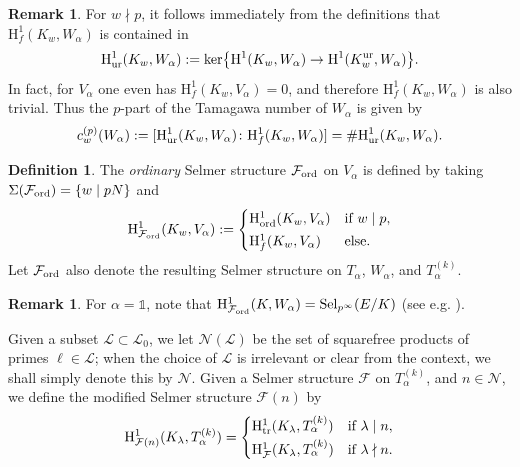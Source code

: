 \documentclass[10pt,reqno]{amsart}
\numberwithin{equation}{section}
\theoremstyle{plain}
\theoremstyle{definition}
\newtheorem{defi}[thm]{Definition}
\newtheorem{rmk}[thm]{Remark}
\theoremstyle{definition}
\theoremstyle{plain}
\theoremstyle{plain}
\theoremstyle{plain}
\theoremstyle{plain}
\theoremstyle{plain}
\theoremstyle{plain}
\DeclareMathOperator{\ord}{ord}
\newcommand{\Lcal}{\mathcal{L}}
\newcommand{\Fcal}{\mathcal{F}}
\newcommand{\rH}{\mathrm{H}}
\begin{document}
\begin{rmk}\label{rem:tam}
For $w\nmid p$, it follows immediately from the definitions that $\rH^1_f(K_w,W_\alpha)$ is contained in 
\[
\rH^1_{\rm ur}(K_w,W_{\alpha}):={\rm ker}\bigl\{\rH^1(K_w,W_{\alpha})\rightarrow\rH^1(K_w^{\rm ur},W_{\alpha})\bigr\}.
\]
In fact, for $V_\alpha$ one even has $\rH^1_f(K_w,V_\alpha)=0$, and therefore $\rH^1_f(K_w,W_\alpha)$ is also trivial. Thus the $p$-part of the Tamagawa number of $W_\alpha$ is given by
\[
c_w^{(p)}(W_\alpha):=[\rH^1_{\rm ur}(K_w,W_\alpha)\colon\rH^1_f(K_w,W_\alpha)]=\#\rH^1_{\rm ur}(K_w,W_\alpha).
\]
\end{rmk}



\begin{defi}
The \emph{ordinary} Selmer structure $\Fcal_{\rm ord}$ on $V_\alpha$ is defined by taking $\Sigma(\Fcal_{\rm \ord}) = \{w\mid pN\}$ and  
\[
\rH^1_{\Fcal_{\rm ord}}(K_w,V_\alpha):=
\begin{cases}
\rH^1_{\rm ord}(K_w,V_\alpha) & \textrm{if $w\mid p$,}\\[0.2em]
\rH^1_f(K_w,V_\alpha)& \textrm{else.}
\end{cases}
\]
Let $\Fcal_{\rm ord}$ also denote the resulting Selmer structure on $T_\alpha$, $W_\alpha$, and $T_\alpha^{(k)}$.
\end{defi}

\begin{rmk}\label{rmk:usualsel}
For $\alpha=\mathds{1}$, %
note that $\rH^1_{\Fcal_{\rm ord}}(K,W_\alpha)={\rm Sel}_{p^\infty}(E/K)$ (see e.g. \cite[Prop.\,1.6.8]{rubin-ES}).
\end{rmk}

Given a subset $\Lcal\subset\Lcal_0$, we let $\mathcal{N}(\Lcal)$ be the set of squarefree products of primes $\ell\in\Lcal$; when the choice of $\Lcal$ is irrelevant or clear from the context, we shall simply denote this by $\mathcal{N}$.  
Given a Selmer structure $\Fcal$ on $T_\alpha^{(k)}$, and $n\in\mathcal{N}$, 
we define the modified Selmer structure $\Fcal(n)$ by
\[
\rH^1_{\Fcal(n)}(K_\lambda,T_\alpha^{(k)})
=\begin{cases}
\rH^1_{\rm tr}(K_\lambda,T_\alpha^{(k)}) &\text{if }\lambda\mid n, \\[0.2em]
\rH^1_{\Fcal}(K_\lambda,T_\alpha^{(k)}) & \text{if }\lambda\nmid n.
\end{cases}
\]
\end{document}
